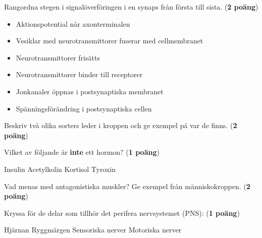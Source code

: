 \documentclass{exam}
\begin{document}
\vspace{5mm} %
\begin{center}
\end{center}
\begin{questions}

\question Rangordna stegen i signalöverföringen i en synaps från första till sista. (\textbf{2 poäng})

\begin{itemize}
  \item Aktionspotential når axonterminalen
  \item Vesiklar med neurotransmittorer fuserar med cellmembranet
  \item Neurotransmittorer frisätts
  \item Neurotransmittorer binder till receptorer
  \item Jonkanaler öppnas i postsynaptiska membranet
  \item Spänningsförändring i postsynaptiska cellen
\end{itemize}

\vspace{5mm}

\question Beskriv två olika sorters leder i kroppen och ge exempel på var de finns. (\textbf{2 poäng})
\vspace{40mm}

\question Vilket av följande är \textbf{inte} ett hormon? (\textbf{1 poäng})
\begin{checkboxes}
    \choice Insulin
    \choice Acetylkolin
    \choice Kortisol
    \choice Tyroxin
\end{checkboxes}

\vspace{5mm}

\question Vad menas med antagonistiska muskler? Ge exempel från människokroppen. (\textbf{2 poäng})
\vspace{25mm}

\question Kryssa för de delar som tillhör det perifera nervsystemet (PNS): (\textbf{1 poäng})
\begin{checkboxes}
    \choice Hjärnan
    \choice Ryggmärgen
    \choice Sensoriska nerver
    \choice Motoriska nerver
\end{checkboxes}


\end{questions}
\end{document}

